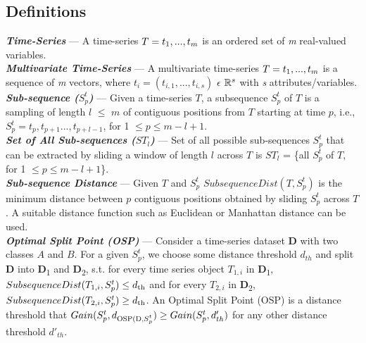 \documentclass[conference]{IEEEtran}  %
\begin{document}
\subsection{Definitions}
\textbf{\textit{Time-Series}} --- A time-series $T = t\textsubscript{1},..., t_m$ is an ordered set of \textit{m} real-valued variables.
\smallskip\\
\textbf{\textit{Multivariate Time-Series}} --- A multivariate time-series $T = t\textsubscript{1}, . . . , t_m$ is a sequence of \textit{m} vectors, where $t_i = (t_{i,1}, . . . , t_{i,s})$ $\epsilon$ $\mathbb{R}\textsuperscript{\(s\)}$ with \textit{s} attributes/variables.
\smallskip\\
\textbf{\textit{Sub-sequence ($S^t_p$)}} --- Given a time-series $T$, a subsequence $S^t_p$ of $T$ is a sampling of length $l$ \(\leq\) $m$ of contiguous positions from $T$ starting at time $p$, i.e., $S^t_p = t_p, t_{p+1}...,t_{p+l-1}$, for 1 \(\leq p \leq m - l + 1\).
\smallskip\\
\textbf{\textit{Set of All Sub-sequences ($ST_l$)}} --- Set of all possible sub-sequences $S^t_p$ that can be extracted by sliding a window of length $l$ across $T$ is $ST_l$ = \{all $S^t_p$ of $T$,  for 1 \(\leq p \leq m - l + 1\)\}.
\smallskip\\
\textbf{\textit{Sub-sequence Distance}} --- Given $T$ and $S^t_p$ \(SubsequenceDist(T,S^t_p)\) is the minimum distance between $p$ contiguous positions obtained by sliding $S^t_p$ across $T$. A suitable distance function such as Euclidean or Manhattan distance can be used.
\smallskip\\
\textbf{\textit{Optimal Split Point (OSP)}} --- Consider a time-series dataset \textbf{D} with two classes $A$ and $B$. For a given $S^t_p$, we choose some distance threshold $d_{th}$ and split \textbf{D} into \textbf{D}\textsubscript{1} and \textbf{D}\textsubscript{2}, s.t. for every time series object $T_{1,i}$ in \textbf{D}\textsubscript{1}, \(SubsequenceDist(T_{1,i}, S^t_p) \leq d\textsubscript{th}\) and for every $T_{2,i}$ in \textbf{D}\textsubscript{2}, \(SubsequenceDist(T_{2,i}, S^t_p) \geq d\textsubscript{th}\). An Optimal Split Point (OSP) is a distance threshold that \( Gain(S^t_p,d\textsubscript{OSP(D,$S^t_p$}) \geq Gain(S^t_p,d'_{th}) \) for any other distance threshold $d'_{th}$.
\end{document}
